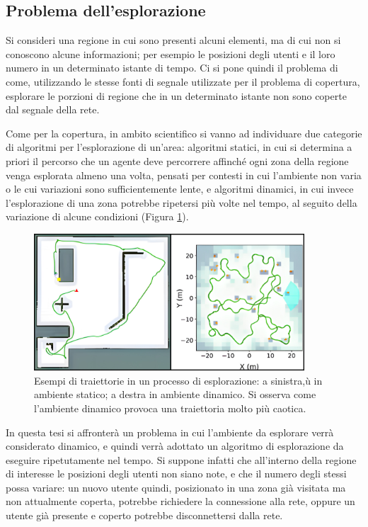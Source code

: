 \subsection{Problema dell'esplorazione} \label{subsec:prob_esplorazione}
Si consideri una regione in cui sono presenti alcuni elementi, ma di cui non si conoscono alcune informazioni; per esempio le posizioni degli utenti e il loro numero in un determinato istante di tempo.
Ci si pone quindi il problema di come, utilizzando le stesse fonti di segnale utilizzate per il problema di copertura, esplorare le porzioni di regione che in un determinato istante non sono coperte dal segnale della rete.

Come per la copertura, in ambito scientifico si vanno ad individuare due categorie di algoritmi per l'esplorazione di un'area: algoritmi statici, in cui si determina a priori il percorso che un agente deve percorrere affinché ogni zona della regione venga esplorata almeno una volta, pensati per contesti in cui l'ambiente non varia o le cui variazioni sono sufficientemente lente, e algoritmi dinamici, in cui invece l'esplorazione di una zona potrebbe ripetersi più volte nel tempo, al seguito della variazione di alcune condizioni (Figura \ref{fig:path_static_dynamic_environment}).

\begin{figure}[ht]
    \centering
    \includegraphics[width=0.9\textwidth]{img/ch1/path_dynamic_static_environment.jpg}
    \caption[Esempi di traiettorie in ambiente statico e dinamico]{Esempi di traiettorie in un processo di esplorazione: a sinistra,ù in ambiente statico; a destra in ambiente dinamico. Si osserva come l'ambiente dinamico provoca una traiettoria molto più caotica.}
    \label{fig:path_static_dynamic_environment}
\end{figure}
\pagebreak
In questa tesi si affronterà un problema in cui l'ambiente da esplorare verrà considerato dinamico, e quindi verrà adottato un algoritmo di esplorazione da eseguire ripetutamente nel tempo.
Si suppone infatti che all'interno della regione di interesse le posizioni degli utenti non siano note, e che il numero degli stessi possa variare: un nuovo utente quindi, posizionato in una zona già visitata ma non attualmente coperta, potrebbe richiedere la connessione alla rete, oppure un utente già presente e coperto potrebbe disconnettersi dalla rete.
